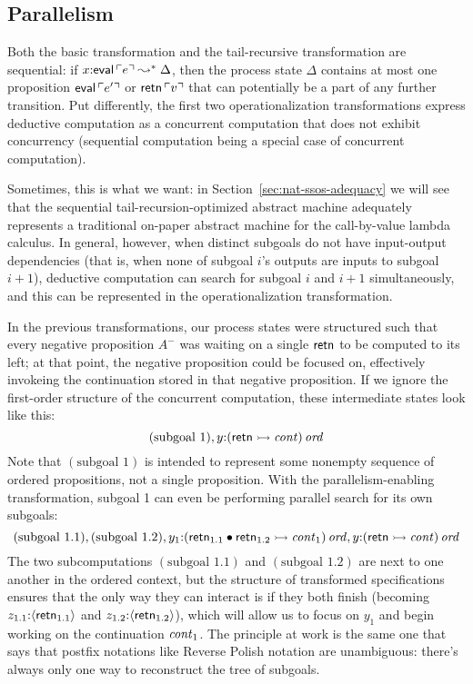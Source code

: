 \subsection{Parallelism}
\label{sec:trans-par}

Both the basic transformation and the tail-recursive transformation
are sequential: if $x{:}{\sf eval}\,{\ulcorner{e}\urcorner} \leadsto^* \Delta$,
then the process state $\Delta$ contains at most one proposition ${\sf
  eval}\,{\ulcorner{e'}\urcorner}$ or ${\sf retn}\,{\ulcorner{v}\urcorner}$ that can potentially
be a part of any further transition. Put differently, the first two
operationalization transformations express deductive computation as a
concurrent computation that does not exhibit concurrency (sequential
computation being a special case of concurrent computation).

Sometimes, this is what we want: in
Section~\ref{sec:nat-ssos-adequacy} we will see that the sequential
tail-recursion-optimized abstract machine 
adequately represents a traditional on-paper abstract machine for
the call-by-value lambda calculus. In general, however, when distinct
subgoals do not have input-output dependencies (that is, when none of
subgoal $i$'s outputs are inputs to subgoal $i+1$), deductive computation
can search for subgoal $i$ and $i+1$ simultaneously, and this can 
be represented in the operationalization transformation.

In the previous transformations, our process states were structured
such that every negative proposition $A^-$ was waiting on a single
${\sf retn}$ to be computed to its left; at that point, the negative
proposition could be focused on, effectively invokeing the
continuation stored in that negative proposition. If we ignore the
first-order structure of the concurrent computation, these
intermediate states look like this:
\[
  (\mbox{subgoal 1}), y{:}{({\sf retn} \rightarrowtail {\it cont})}\,{{\it ord}}
\]
Note that $(\mbox{subgoal 1})$ is intended to represent some nonempty
sequence of ordered propositions, not a single proposition. With the
parallelism-enabling transformation, subgoal 1 can even be performing
parallel search for its own subgoals:
\[
 (\mbox{subgoal 1.1}), (\mbox{subgoal 1.2}), 
   y_1{:}{({\sf retn}_{1.1} \mathbin{\bullet} {\sf retn}_{1.2} \rightarrowtail {\it cont}_1)}\,{{\it ord}}, 
   y{:}{({\sf retn} \rightarrowtail {\it cont})}\,{{\it ord}}
\]
The two subcomputations $(\mbox{subgoal 1.1})$ and $(\mbox{subgoal
  1.2})$ are next to one another in the ordered context, but the
structure of transformed specifications ensures that the only way they
can interact is if they both finish (becoming $z_{1.1}{:}\langle {{\sf
    retn}_{1.1}} \rangle$ and $z_{1.2}{:}\langle {{\sf retn}_{1.2}} \rangle$), which will
allow us to focus on $y_1$ and begin working on the continuation ${\it
  cont}_1$. The principle at work is the same one that says that postfix
notations like Reverse Polish notation are unambiguous: there's always
only one way to reconstruct the tree of subgoals. 

